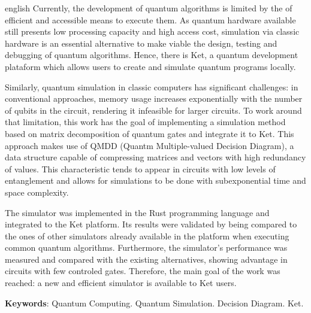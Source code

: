 \begin{resumo}[Abstract]
  \begin{otherlanguage*}{english}
    Currently, the development of quantum algorithms is limited by the of efficient and accessible means to execute them. As quantum hardware available still presents low processing capacity and high access cost, simulation via classic hardware is an essential alternative to make viable the design, testing and debugging of quantum algorithms. Hence, there is Ket, a quantum development plataform which allows users to create and simulate quantum programs locally.

    Similarly, quantum simulation in classic computers has significant challenges: in conventional approaches, memory usage increases exponentially with the number of qubits in the circuit, rendering it infeasible for larger circuits. To work around that limitation, this work has the goal of implementing a simulation method based on matrix decomposition of quantum gates and integrate it to Ket. This approach makes use of QMDD (Quantm Multiple-valued Decision Diagram), a data structure capable of compressing matrices and vectors with high redundancy of values. This characteristic tends to appear in circuits with low levels of entanglement and allows for simulations to be done with subexponential time and space complexity.

    The simulator was implemented in the Rust programming language and integrated to the Ket platform. Its results were validated by being compared to the ones of other simulators already available in the platform when executing common quantum algorithms. Furthermore, the simulator's performance was measured and compared with the existing alternatives, showing advantage in circuits with few controled gates. Therefore, the main goal of the work was reached: a new and efficient simulator is available to Ket users.

    \textbf{Keywords}: Quantum Computing. Quantum Simulation. Decision Diagram. Ket.
  \end{otherlanguage*}
\end{resumo}

% 
%
%  

